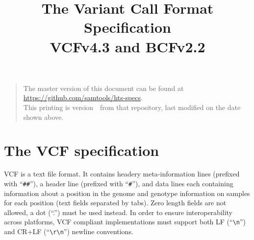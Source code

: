 \documentclass[8pt]{article}
\begin{document}

\title{The Variant Call Format Specification \\ \vspace{0.5em} \large VCFv4.3 and BCFv2.2}
\date{\headdate}
\maketitle
\begin{quote}\small
The master version of this document can be found at \url{https://github.com/samtools/hts-specs}.\\
This printing is version~\commitdesc\ from that repository, last modified on the date shown above.
\end{quote}
\vspace*{1em}

\newpage
\tableofcontents
\newpage

\section{The VCF specification}
VCF is a text file format.
It contains headery meta-information lines (prefixed with ``\verb|##|''), a header line (prefixed with ``\verb|#|''), and data lines each containing information about a position in the genome and genotype information on samples for each position (text fields separated by tabs).
Zero length fields are not allowed, a dot (``.'') must be used instead.
In order to ensure interoperability across platforms, VCF compliant implementations must support both LF (``\verb|\n|'') and CR+LF (``\verb|\r\n|'') newline conventions.
\end{document}
